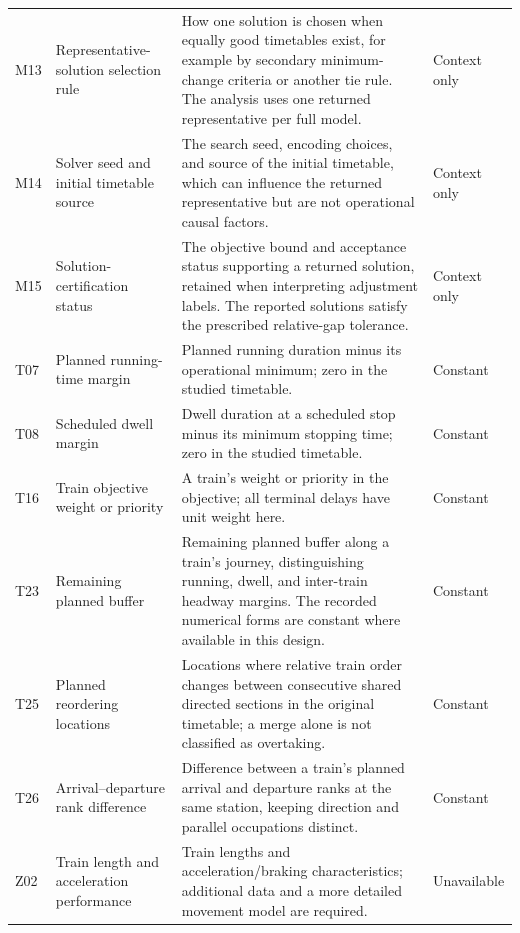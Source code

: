 \begin{longtable}{@{}>{\raggedright\arraybackslash}p{0.7cm}>{\raggedright\arraybackslash}p{3.0cm}>{\raggedright\arraybackslash}p{8.6cm}>{\raggedright\arraybackslash}p{1.9cm}@{}}
M13 & Representative-solution selection rule & How one solution is chosen when equally good timetables exist, for example by secondary minimum-change criteria or another tie rule. The analysis uses one returned representative per full model. & Context only \\

M14 & Solver seed and initial timetable source & The search seed, encoding choices, and source of the initial timetable, which can influence the returned representative but are not operational causal factors. & Context only \\

M15 & Solution-certification status & The objective bound and acceptance status supporting a returned solution, retained when interpreting adjustment labels. The reported solutions satisfy the prescribed relative-gap tolerance. & Context only \\

T07 & Planned running-time margin & Planned running duration minus its operational minimum; zero in the studied timetable. & Constant \\

T08 & Scheduled dwell margin & Dwell duration at a scheduled stop minus its minimum stopping time; zero in the studied timetable. & Constant \\

T16 & Train objective weight or priority & A train's weight or priority in the objective; all terminal delays have unit weight here. & Constant \\

T23 & Remaining planned buffer & Remaining planned buffer along a train's journey, distinguishing running, dwell, and inter-train headway margins. The recorded numerical forms are constant where available in this design. & Constant \\

T25 & Planned reordering locations & Locations where relative train order changes between consecutive shared directed sections in the original timetable; a merge alone is not classified as overtaking. & Constant \\

T26 & Arrival--departure rank difference & Difference between a train's planned arrival and departure ranks at the same station, keeping direction and parallel occupations distinct. & Constant \\

Z02 & Train length and acceleration performance & Train lengths and acceleration/braking characteristics; additional data and a more detailed movement model are required. & Unavailable \\


\end{longtable}
